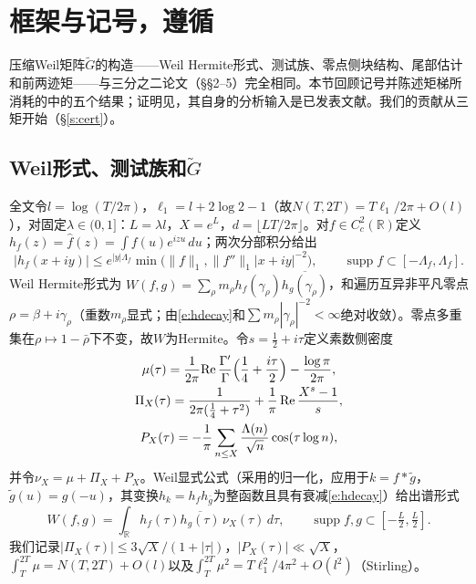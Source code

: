 \documentclass[11pt]{article}
\numberwithin{equation}{section}
\theoremstyle{definition}
\theoremstyle{remark}
\newcommand{\LL}{\Lambda}
\begin{document}
\section{框架与记号，遵循\cite{C26}}\label{s:frame}

压缩Weil矩阵$\widetilde G$的构造——Weil Hermite形式、测试族、零点侧块结构、尾部估计和前两迹矩——与三分之二论文\cite{C26}（§§2--5）完全相同。本节回顾记号并陈述矩梯所消耗的\cite{C26}中的五个结果；证明见\cite{C26}，其自身的分析输入是已发表文献\cite{Wei52,IK,Tit86,Mon73,BGST}。我们的贡献从三矩开始（\S\ref{s:cert}）。

\subsection{Weil形式、测试族和$\widetilde G$}\label{s:frame:G}

全文令$l=\log(T/2\pi)$，$\ell_1=l+2\log2-1$（故$N(T,2T)=T\ell_1/2\pi+O(l)$），对固定$\lambda\in(0,1]$：$L=\lambda l$，$X=e^{L}$，$d=\lfloor LT/2\pi\rfloor$。对$f\in C_c^{2}(\mathbb R)$定义$h_f(z)=\widehat f(z)=\int f(u)e^{izu}\,du$；两次分部积分给出
\begin{equation}\label{e:hdecay}
|h_f(x+iy)|\le e^{|y|\Lambda_f}
\min\bigl(\|f\|_1,\|f''\|_1|x+iy|^{-2}\bigr),
\qquad\operatorname{supp}f\subset[-\Lambda_f,\Lambda_f].
\end{equation}
Weil Hermite形式为
$W(f,g)=\sum_{\rho}m_\rho h_f(\gamma_\rho)
\overline{h_g(\gamma_\rho)}$，和遍历互异非平凡零点$\rho=\beta+i\gamma_\rho$（重数$m_\rho$显式；由\eqref{e:hdecay}和$\sum m_\rho|\gamma_\rho|^{-2}<\infty$绝对收敛）。零点多重集在$\rho\mapsto1-\bar\rho$下不变，故$W$为Hermite。令$s=\tfrac12+i\tau$定义素数侧密度
\begin{gather*}
\mu(\tau)=\frac1{2\pi}\mathrm{Re}\,
\frac{\Gamma'}{\Gamma}\Bigl(\frac14+\frac{i\tau}2\Bigr)
-\frac{\log\pi}{2\pi}, \\
\Pi_X(\tau)=\frac{1}{2\pi(\tfrac14+\tau^{2})}
+\frac1\pi\,\mathrm{Re}\,\frac{X^{s}-1}{s}, \\
P_X(\tau)=-\frac1\pi\sum_{n\le X}
\frac{\LL(n)}{\sqrt n}\cos(\tau\log n),
\end{gather*}
并令$\nu_X=\mu+\Pi_X+P_X$。Weil显式公式\cite{Wei52}（采用\cite[定理5.12]{IK}的归一化，应用于$k=f*\tilde g$，$\tilde g(u)=g(-u)$，其变换$h_k=h_fh_{\bar g}$为整函数且具有衰减\eqref{e:hdecay}）给出谱形式
\begin{equation}\label{e:weil}
W(f,g)=\int_{\mathbb R}h_f(\tau)\overline{h_g(\tau)}\,
\nu_X(\tau)\,d\tau,
\qquad\operatorname{supp}f,g\subset[-\tfrac L2,\tfrac L2].
\end{equation}
我们记录$|\Pi_X(\tau)|\le3\sqrt X/(1+|\tau|)$，$|P_X(\tau)|\ll\sqrt X$，$\int_T^{2T}\mu=N(T,2T)+O(l)$以及$\int_T^{2T}\mu^{2}=T\ell_1^{2}/4\pi^{2}+O(l^{2})$（Stirling）。
\end{document}
